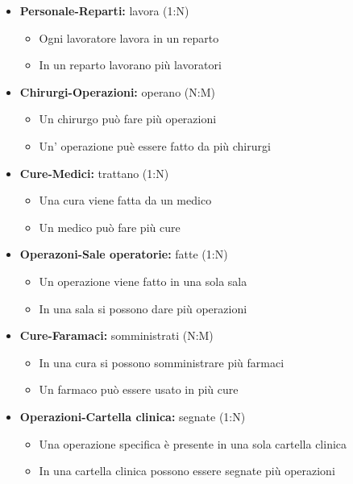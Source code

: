 \documentclass[a4paper, 10pt]{article}
\begin{document}
\begin{spacing}{0.3}
    
\begin{itemize}
    \item \textbf{Personale-Reparti:} lavora (1:N)
    \begin{itemize}
        \item Ogni lavoratore lavora in un reparto
        \item In un reparto lavorano più lavoratori
    \end{itemize}
    \item \textbf{Chirurgi-Operazioni:} operano (N:M)
    \begin{itemize}
        \item Un chirurgo può fare più operazioni
        \item Un' operazione puè essere fatto da più chirurgi
    \end{itemize}
    \item \textbf{Cure-Medici:} trattano (1:N)
    \begin{itemize}
        \item Una cura viene fatta da un medico
        \item Un medico può fare più cure
    \end{itemize}
    \item \textbf{Operazoni-Sale operatorie:} fatte (1:N)
    \begin{itemize}
        \item Un operazione viene fatto in una sola sala
        \item In una sala si possono dare più operazioni
    \end{itemize}
    \item \textbf{Cure-Faramaci:} somministrati (N:M)
    \begin{itemize}
        \item In una cura si possono somministrare più farmaci
        \item Un farmaco può essere usato in più cure
    \end{itemize}
    \item \textbf{Operazioni-Cartella clinica:} segnate (1:N)
    \begin{itemize}
        \item Una operazione specifica è presente in una sola cartella clinica
        \item In una cartella clinica possono essere segnate più operazioni
    \end{itemize}

\end{itemize}
\end{spacing}
\end{document}
